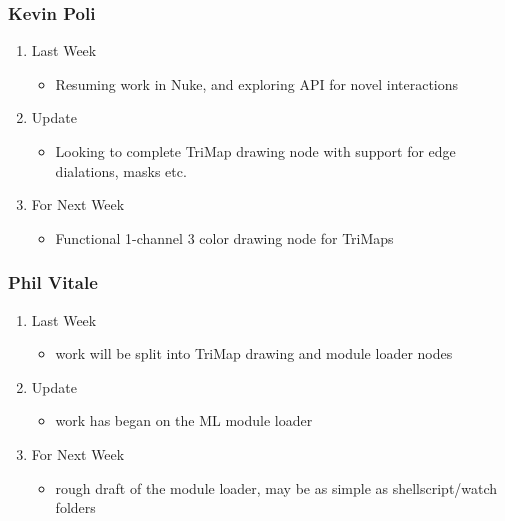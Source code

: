 \documentclass[15pt]{article}
\begin{document}
\subsubsection{Kevin Poli}
\label{sec:orgb78b303}
\begin{enumerate}
\item Last Week
\label{sec:org452a592}
\begin{itemize}
\item Resuming work in Nuke, and exploring API for novel interactions
\end{itemize}
\item Update
\label{sec:orge3e3cc8}
\begin{itemize}
\item Looking to complete TriMap drawing node with support for edge dialations, masks etc.
\end{itemize}
\item For Next Week
\label{sec:org2339e56}
\begin{itemize}
\item Functional 1-channel 3 color drawing node for TriMaps
\end{itemize}
\end{enumerate}
\subsubsection{Phil Vitale}
\label{sec:org22a2b59}
\begin{enumerate}
\item Last Week
\label{sec:orgf06e107}
\begin{itemize}
\item work will be split into TriMap drawing and module loader nodes
\end{itemize}
\item Update
\label{sec:orgae70728}
\begin{itemize}
\item work has began on the ML module loader
\end{itemize}
\item For Next Week
\label{sec:org6c4ddc0}
\begin{itemize}
\item rough draft of the module loader, may be as simple as shellscript/watch folders
\end{itemize}
\end{enumerate}
\end{document}
